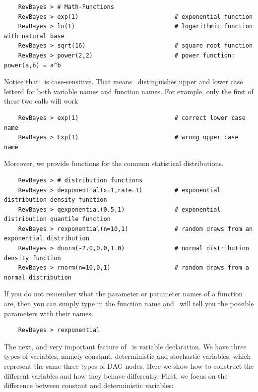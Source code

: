 {\tt \begin{snugshade*}
\begin{lstlisting}    
    RevBayes > # Math-Functions
    RevBayes > exp(1)                           # exponential function
    RevBayes > ln(1)                            # logarithmic function with natural base
    RevBayes > sqrt(16)                         # square root function 
    RevBayes > power(2,2)                       # power function: power(a,b) = a^b
\end{lstlisting}
\end{snugshade*}}
Notice that \Rev~is case-sensitive. That means \Rev~distinguishes upper and lower case letterd for both variable names and function names. For example, only the first of these two calls will work
{\tt \begin{snugshade*}
\begin{lstlisting}    
    RevBayes > exp(1)                           # correct lower case name
    RevBayes > Exp(1)                           # wrong upper case name
\end{lstlisting}
\end{snugshade*}}
Moreover, we provide functions for the common statistical distributions.
{\tt \begin{snugshade*}
\begin{lstlisting}    
    RevBayes > # distribution functions
    RevBayes > dexponential(x=1,rate=1)         # exponential distribution density function
    RevBayes > qexponential(0.5,1)              # exponential distribution quantile function
    RevBayes > rexponential(n=10,1)             # random draws from an exponential distribution
    RevBayes > dnorm(-2.0,0.0,1.0)              # normal distribution density function
    RevBayes > rnorm(n=10,0,1)                  # random draws from a normal distribution
\end{lstlisting}
\end{snugshade*}}
If you do not remember what the parameter or parameter names of a function are, then you can simply type in the function name and \RevBayes~will tell you the possible parameters with their names.
{\tt \begin{snugshade*}
\begin{lstlisting}    
    RevBayes > rexponential
\end{lstlisting}
\end{snugshade*}}

The next, and very important feature of \RevBayes~is variable declaration. 
We have three types of variables, namely constant, deterministic and stochastic variables, which represent the same three types of DAG nodes. 
Here we show how to construct the different variables and how they behave differently. 
First, we focus on the difference between constant and deterministic variables: 


